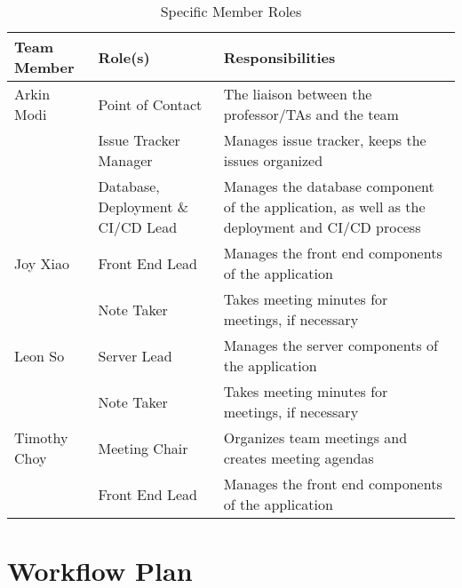 \documentclass{article}
\begin{document}
\begin{table}[H]
	\centering
	\caption{Specific Member Roles}
	\vspace{5pt}
	\begin{tabular}{|p{}|p{}|p{}|}
		\hline
		\textbf{Team Member} & \textbf{Role(s)}                   & \textbf{Responsibilities}                             \\
		\hline
		Arkin Modi           & Point of Contact                   & The liaison between the professor/TAs
		and the team                                                                                                      \\
		\cline{2-3}
		                     & Issue Tracker Manager              & Manages issue tracker, keeps the issues
		organized                                                                                                         \\
		\cline{2-3}
		                     & Database, Deployment \& CI/CD Lead & Manages the database component of the application, as
		well as the deployment and CI/CD process                                                                          \\
		\hline
		Joy Xiao             & Front End Lead                     & Manages the front end components of the application   \\
		\cline{2-3}
		                     & Note Taker                         & Takes meeting minutes for meetings, if necessary      \\
		\hline
		Leon So              & Server Lead                        & Manages the server components of the application      \\
		\cline{2-3}
		                     & Note Taker                         & Takes meeting minutes for meetings, if necessary      \\
		\hline
		Timothy Choy         & Meeting Chair                      & Organizes team meetings and creates meeting agendas   \\
		\cline{2-3}
		                     & Front End Lead                     & Manages the front end components of the application   \\
		\hline
	\end{tabular}
\end{table}

\section{Workflow Plan}
\end{document}
